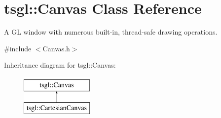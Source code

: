 \hypertarget{classtsgl_1_1_canvas}{\section{tsgl\-:\-:Canvas Class Reference}
\label{classtsgl_1_1_canvas}
}


A G\-L window with numerous built-\/in, thread-\/safe drawing operations.  




{\ttfamily \#include $<$Canvas.\-h$>$}

Inheritance diagram for tsgl\-:\-:Canvas\-:\begin{figure}[H]
\begin{center}
\leavevmode
\includegraphics[height=2.000000cm]{classtsgl_1_1_canvas}
\end{center}
\end{figure}
